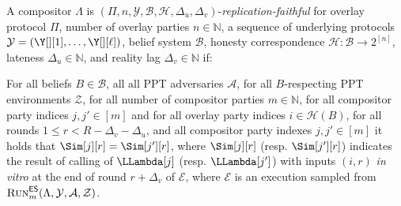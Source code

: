 \begin{definition}\label{def:replication-faithfulness}
  A compositor $\Lambda$ is
  $(\Pi, n,\allowbreak \mathcal{Y}, \mathcal{B}, \mathcal{H}, \Delta_u, \Delta_v)$-\emph{replication-faithful}
  for overlay protocol $\Pi$,
  number of overlay parties $n \in \mathbb{N}$,
  a sequence of underlying protocols $\mathcal{Y} = (\Y[][1], \ldots, \Y[][\ell])$,
  belief system $\mathcal{B}$,
  honesty correspondence $\mathcal{H}: \mathcal{B} \longrightarrow 2^{[n]}$,
  lateness $\Delta_u \in \mathbb{N}$,
  and reality lag $\Delta_v \in \mathbb{N}$
  if:

  For all beliefs $B \in \mathcal{B}$,
  all all PPT adversaries $\mathcal{A}$,
  for all $B$-respecting PPT environments $\mathcal{Z}$,
  for all number of compositor parties $m \in \mathbb{N}$,
  for all compositor party indices $j, j' \in [m]$
  and for all overlay party indices $i \in \mathcal{H}(B)$,
  for all rounds $1 \leq r < R - \Delta_v - \Delta_u$,
  and all compositor party indexes $j, j' \in [m]$ it holds that
  $\Sim[j][r] = \Sim[j'][r]$,
  where $\Sim[j][r]$ (resp. $\Sim[j'][r]$) indicates the result of calling
  \emulationSnapshot of $\LLambda[j]$ (resp. $\LLambda[j']$) with inputs
  $(i, r)$
  \emph{in vitro} at the end of round $r + \Delta_v$ of $\mathcal{E}$,
  where $\mathcal{E}$ is an execution sampled from
  $\textsc{Run}^{\textsf{ES}}_m(\Lambda, \mathcal{Y}, \mathcal{A}, \mathcal{Z})$.
\end{definition}

